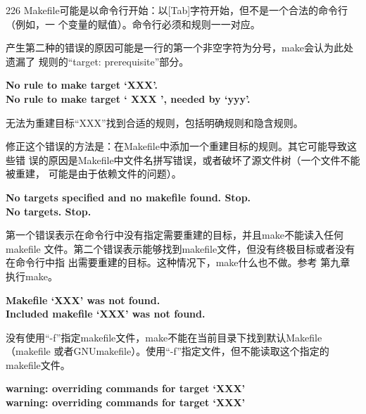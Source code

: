 \begin{dinglist}{226}
Makefile可能是以命令行开始：以[Tab]字符开始，但不是一个合法的命令行（例如，一
个变量的赋值）。命令行必须和规则一一对应。

产生第二种的错误的原因可能是一行的第一个非空字符为分号，make会认为此处遗漏了
规则的“target: prerequisite”部分。

  \item \begin{minipage}[t]{\linewidth}
          \textbf{No rule to make target `XXX'.} \\
          \textbf{No rule to make target ` XXX ', needed by `yyy'.}
        \end{minipage}

无法为重建目标“XXX”找到合适的规则，包括明确规则和隐含规则。

修正这个错误的方法是：在Makefile中添加一个重建目标的规则。其它可能导致这些错
误的原因是Makefile中文件名拼写错误，或者破坏了源文件树（一个文件不能被重建，
可能是由于依赖文件的问题）。

  \item \begin{minipage}[t]{\linewidth}
          \textbf{No targets specified and no makefile found. Stop.} \\
          \textbf{No targets. Stop.}
        \end{minipage}

第一个错误表示在命令行中没有指定需要重建的目标，并且make不能读入任何makefile
文件。第二个错误表示能够找到makefile文件，但没有终极目标或者没有在命令行中指
出需要重建的目标。这种情况下，make什么也不做。参考 第九章 执行make。

  \item \begin{minipage}[t]{\linewidth}
          \textbf{Makefile `XXX' was not found.} \\
          \textbf{Included makefile `XXX' was not found.}
        \end{minipage}

没有使用“-f”指定makefile文件，make不能在当前目录下找到默认Makefile（makefile
或者GNUmakefile）。使用“-f”指定文件，但不能读取这个指定的makefile文件。

  \item \begin{minipage}[t]{\linewidth}
          \textbf{warning: overriding commands for target `XXX'} \\
          \textbf{warning: overriding commands for target `XXX'}
        \end{minipage}


\end{dinglist}
